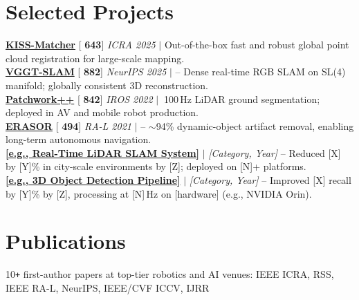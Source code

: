 \documentclass[letterpaper,10pt]{article}
\newcommand{\githubstars}[1]{[{\faGithubSquare}\,\ding{72}\,\textbf{#1}]}
\begin{document}
\section{Selected Projects}
 \begin{itemize}[leftmargin=0.15in, label={}]
    \small{\item{
     \href{https://github.com/MIT-SPARK/KISS-Matcher}{\textbf{KISS-Matcher}} \githubstars{643} \emph{ICRA 2025}  $|$ Out-of-the-box fast and robust global point cloud registration for large-scale mapping. \\
     \href{https://github.com/MIT-SPARK/VGGT-SLAM}{\textbf{VGGT-SLAM}} \githubstars{882} \emph{NeurIPS 2025} $|$  -- Dense real-time RGB SLAM on SL(4) manifold; globally consistent 3D reconstruction. \\
     \href{https://github.com/url-kaist/patchwork-plusplus}{\textbf{Patchwork++}} \githubstars{842} \emph{IROS 2022} $|$  $~$100\,Hz LiDAR ground segmentation; deployed in AV and mobile robot production. \\
     \href{https://github.com/LimHyungTae/ERASOR}{\textbf{ERASOR}} \githubstars{494} \emph{RA-L 2021} $|$  -- ${\sim}$94\% dynamic-object artifact removal, enabling long-term autonomous navigation. \\
     \href{https://github.com/your-org/project1}{\textbf{[e.g., Real-Time LiDAR SLAM System]}} $|$ \emph{[Category, Year]} -- Reduced [X] by [Y]\% in city-scale environments by [Z]; deployed on [N]+ platforms. \\
     \href{https://github.com/your-org/project2}{\textbf{[e.g., 3D Object Detection Pipeline]}} $|$ \emph{[Category, Year]} -- Improved [X] recall by [Y]\% by [Z], processing at [N]\,Hz on [hardware] (e.g., NVIDIA Orin).
    }}
 \end{itemize}


\section{Publications}
 \begin{itemize}[leftmargin=0.15in, label={}]
    \small{\item{
     10\texttt{+} first-author papers at top-tier robotics and AI venues: IEEE ICRA, RSS, IEEE RA-L, NeurIPS, IEEE/CVF ICCV, IJRR
    }}
 \end{itemize}


\end{document}
